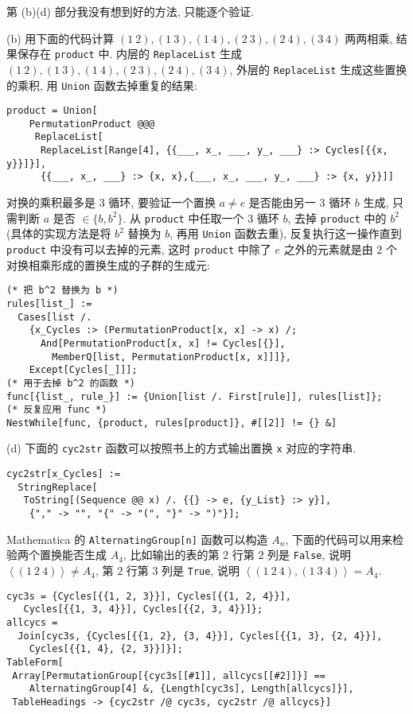 \documentclass[color=black,device=normal,lang=cn,mode=geye]{elegantnote}
\begin{document}
\begin{note}
    第 (b)(d) 部分我没有想到好的方法, 只能逐个验证.
    
    (b) 用下面的代码计算 $(1\ 2),(1\ 3),(1\ 4),(2\ 3),(2\ 4),(3\ 4)$ 两两相乘, 结果保存在 \verb|product| 中. 内层的 \verb|ReplaceList| 生成 $(1\ 2),(1\ 3),(1\ 4),(2\ 3),(2\ 4),(3\ 4)$, 外层的 \verb|ReplaceList| 生成这些置换的乘积, 用 \verb|Union| 函数去掉重复的结果:
    \begin{verbatim}
product = Union[
    PermutationProduct @@@
     ReplaceList[
      ReplaceList[Range[4], {{___, x_, ___, y_, ___} :> Cycles[{{x, y}}]}],
      {{___, x_, ___} :> {x, x},{___, x_, ___, y_, ___} :> {x, y}}]]\end{verbatim}

    对换的乘积最多是 $3$ 循环, 要验证一个置换 $a\neq e$ 是否能由另一 $3$ 循环 $b$ 生成, 只需判断 $a$ 是否 $\in\{b,b^2\}$. 从 \verb|product| 中任取一个 $3$ 循环 $b$, 去掉 \verb|product| 中的 $b^2$ (具体的实现方法是将 $b^2$ 替换为 $b$, 再用 \verb|Union| 函数去重), 反复执行这一操作直到 \verb|product| 中没有可以去掉的元素, 这时 \verb|product| 中除了 $e$ 之外的元素就是由 $2$ 个对换相乘形成的置换生成的子群的生成元:
    \begin{verbatim}
(* 把 b^2 替换为 b *)
rules[list_] := 
  Cases[list /.
    {x_Cycles :> (PermutationProduct[x, x] -> x) /; 
      And[PermutationProduct[x, x] != Cycles[{}], 
        MemberQ[list, PermutationProduct[x, x]]]}, 
    Except[Cycles[_]]];
(* 用于去掉 b^2 的函数 *)
func[{list_, rule_}] := {Union[list /. First[rule]], rules[list]};
(* 反复应用 func *)
NestWhile[func, {product, rules[product]}, #[[2]] != {} &]\end{verbatim}

    (d) 下面的 \verb|cyc2str| 函数可以按照书上的方式输出置换 \verb|x| 对应的字符串.
    \begin{verbatim}
cyc2str[x_Cycles] := 
  StringReplace[
   ToString[(Sequence @@ x) /. {{} -> e, {y_List} :> y}],
    {"," -> "", "{" -> "(", "}" -> ")"}];\end{verbatim}
    
    Mathematica 的 \verb|AlternatingGroup[n]| 函数可以构造 $A_n$, 下面的代码可以用来检验两个置换能否生成 $A_4$, 比如输出的表的第 $2$ 行第 $2$ 列是 \verb|False|, 说明 $\left<(1\ 2\ 4)\right>\neq A_4$, 第 $2$ 行第 $3$ 列是 \verb|True|, 说明 $\left<(1\ 2\ 4),(1\ 3\ 4)\right>=A_4$.
    \begin{verbatim}
cyc3s = {Cycles[{{1, 2, 3}}], Cycles[{{1, 2, 4}}], 
   Cycles[{{1, 3, 4}}], Cycles[{{2, 3, 4}}]};
allcycs = 
  Join[cyc3s, {Cycles[{{1, 2}, {3, 4}}], Cycles[{{1, 3}, {2, 4}}], 
    Cycles[{{1, 4}, {2, 3}}]}];
TableForm[
 Array[PermutationGroup[{cyc3s[[#1]], allcycs[[#2]]}] == 
    AlternatingGroup[4] &, {Length[cyc3s], Length[allcycs]}], 
 TableHeadings -> {cyc2str /@ cyc3s, cyc2str /@ allcycs}]\end{verbatim}
\end{note}
\end{document}
